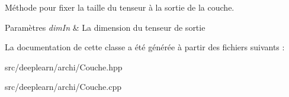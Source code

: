 Méthode pour fixer la taille du tenseur à la sortie de la couche. 


\begin{DoxyParams}{Paramètres}
{\em dim\+In} & La dimension du tenseur de sortie \\
\hline
\end{DoxyParams}


La documentation de cette classe a été générée à partir des fichiers suivants \+:\begin{DoxyCompactItemize}
\item 
src/deeplearn/archi/Couche.\+hpp\item 
src/deeplearn/archi/Couche.\+cpp\end{DoxyCompactItemize}
